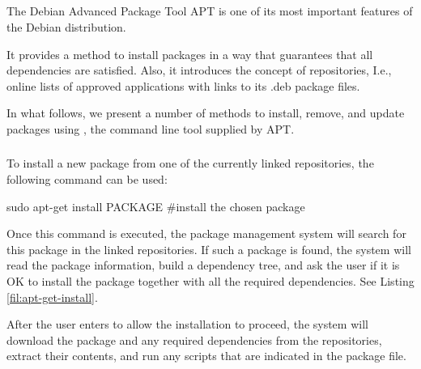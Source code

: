 \subsection{}

The Debian Advanced Package Tool \acs{APT} is one of its most important features of the Debian distribution.

It provides a method to install packages in a way that guarantees that all dependencies are satisfied. Also, it introduces the concept of repositories, I.e., online lists of approved applications with links to its .deb package files.

In what follows, we present a number of methods to install, remove, and update packages using , the command line tool supplied by \acs{APT}.

\subsubsection*{}
\label{sec:apt-get-install}

To install a new package from one of the currently linked repositories, the following command can be used:

\begin{command_line}[make]
sudo apt-get install PACKAGE #install the chosen package
\end{command_line}

Once this command is executed, the package management system will search for this package in the linked repositories. If such a package is found, the system will read the package information, build a dependency tree, and ask the user if it is OK to install the package together with all the required dependencies. See Listing \ref{fil:apt-get-install}.

After the user enters  to allow the installation to proceed, the system will download the package and any required dependencies from the repositories, extract their contents, and run any scripts that are indicated in the  package file.  



